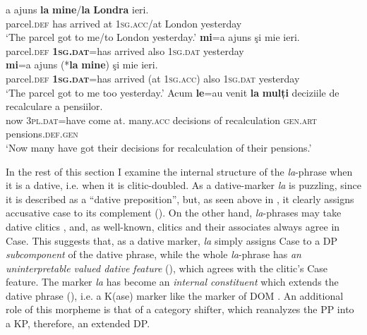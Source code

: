 \documentclass[output=paper,colorlinks,citecolor=brown,nonflat]{langsci/langscibook}
\begin{document}
\ea%
      \label{ex:cornilescu:11}
         \ea \label{ex:cornilescu:11a}
          {a} {ajuns} \textbf{{la}} \textbf{mine}/\textbf{la} \textbf{{Londra}} {ieri}.	\\
         	 parcel.\textsc{def} has arrived at \textsc{1sg.acc}/at London yesterday\\
         \glt ‘The parcel got to me/to London yesterday.’
         \ex \label{ex:cornilescu:11b}
          \textbf{{mi}}{=a} {ajuns} {şi} {mie} {ieri.}	\\
         	parcel.\textsc{def} \textbf{\textsc{1sg.dat}}=has arrived also \textsc{1sg.dat} yesterday\\
         \ex \label{ex:cornilescu:11c}
          \textbf{{mi}}{=a} {ajuns} (*\textbf{la} \textbf{mine}) {şi} {mie} {ieri}.	\\
         parcel.\textsc{def} \textbf{\textsc{1sg.dat}}=has arrived (at \textsc{1sg.acc}) also \textsc{1sg.dat} yesterday\\
         \glt ‘The parcel got to me too yesterday.’
         \ex \label{ex:cornilescu:11d}
         \gll Acum \textbf{{le}}{=au} {venit} \textbf{{la}} \textbf{{mulți}} {deciziile} {de} {recalculare} a pensiilor.\\
         	now \textsc{3pl.dat}=have come at. many.\textsc{acc} decisions of  recalculation \textsc{gen.art} pensions.\textsc{def.gen}\\
         \glt ‘Now many have got their decisions for recalculation of their pensions.’
         \z
         \z

In the rest of this section I examine the internal structure of the \textit{la}{}-phrase when it is a dative, i.e. when it is clitic-doubled. As a dative-marker \textit{la} is puzzling, since it is described as a “dative preposition”, but, as seen above in , it clearly assigns accusative case to its complement (). On the other hand, \textit{la}{}-phrases may take dative clitics , and, as well-known, clitics and their associates always agree in Case. This suggests that, as a dative marker, \textit{la} simply assigns Case to a DP \textit{subcomponent} of the dative phrase, while the whole \textit{la}{}-phrase has \textit{an uninterpretable valued dative feature} (), which agrees with the clitic’s Case feature. The marker \textit{la} has become an \textit{internal constituent} which extends the dative phrase (), i.e. a K(ase) marker like the marker of DOM \citep{López2012}. An additional role of this morpheme is that of a category shifter, which reanalyzes the PP into a KP, therefore, an extended DP.
\end{document}
